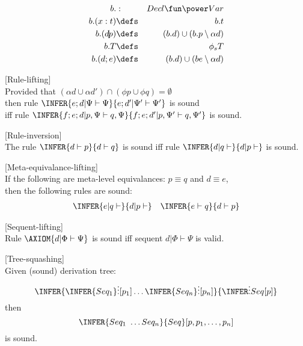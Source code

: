 \begin{eqnarray*}
   b. &:& Decl \fun \power Var
\\ b. (x:t) &\defs& b. t
\\ b. (d\!|\!p) &\defs& (b. d) \cup (b. p \setminus \alpha d)
\\ b. T &\defs& \phi_s T
\\ b. (d;e) &\defs& (b. d) \cup (b e \setminus \alpha d)
\end{eqnarray*}


[Rule-lifting]
\\
Provided that $(\alpha d \cup \alpha d') \cap (\phi p \cup \phi q) = \emptyset$
\\then rule
$
\INFER%
     {e; d | \Psi \vdash \Psi}%
     {e; d' | \Psi' \vdash \Psi'}%
$
is sound
\\iff
rule
$
\INFER%
     {f; e; d | p,\Psi \vdash q,\Psi}%
     {f; e; d' | p,\Psi' \vdash q,\Psi'}%
$
is sound.

[Rule-inversion]
\\ 
The rule
$
\INFER%
     {d \vdash p}%
     {d \vdash q}%
$
is sound
iff
rule
$
\INFER%
     {d | q \vdash}%
     {d | p \vdash}%
$
is sound.

[Meta-equivalance-lifting]
\\ If the following are meta-level equivalances: $p \equiv q$ and $d \equiv e$,
\\ then the following rules are sound:
\begin{eqnarray*}
 \INFER{e|q\vdash}{d|p\vdash} && \INFER{e\vdash q}{d\vdash p}
\end{eqnarray*}

[Sequent-lifting]
\\ Rule 
$
\AXIOM{d | \Phi \vdash \Psi}
$
is sound
iff
sequent
$ d | \Phi \vdash \Psi$ is valid.

[Tree-squashing]
\\Given (sound) derivation tree:
$$
 \INFER%
   {\INFER{Seq_1}\vdots[p_1] \ldots  \INFER{Seq_n}\vdots[p_n]}%
   {\INFER\vdots{Seq} [p]}
$$
then
$$
  \INFER%
    {Seq_1 ~ \ldots Seq_n}%
    {Seq}
  [p,p_1,\ldots,p_n]
$$
is sound.



